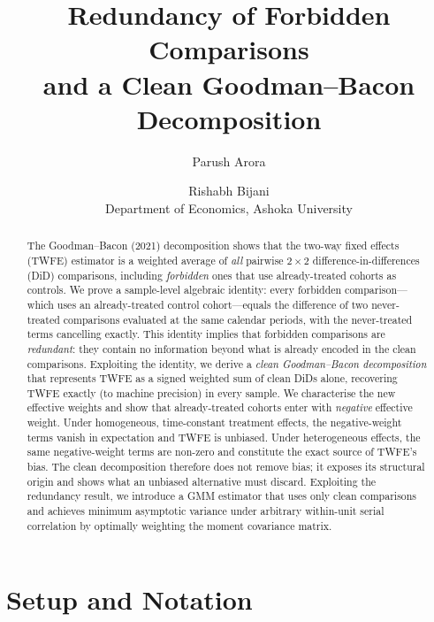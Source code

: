 \documentclass[12pt,letterpaper]{article}
\title{%
  Redundancy of Forbidden Comparisons\\
  and a Clean Goodman--Bacon Decomposition%
}
\author{Parush Arora \and Rishabh Bijani\\
  \small Department of Economics, Ashoka University}
\date{}
\theoremstyle{remark}
\theoremstyle{definition}
\begin{document}
\maketitle

\begin{abstract}
The Goodman--Bacon (2021) decomposition shows that the two-way fixed effects
(TWFE) estimator is a weighted average of \emph{all} pairwise $2\times 2$
difference-in-differences (DiD) comparisons, including \emph{forbidden} ones
that use already-treated cohorts as controls. We prove a sample-level
algebraic identity: every forbidden comparison---which uses an already-treated
control cohort---equals the difference of two never-treated comparisons
evaluated at the same calendar periods, with the never-treated terms cancelling
exactly. This identity implies that forbidden comparisons are
\emph{redundant}: they contain no information beyond what is already encoded
in the clean comparisons. Exploiting the identity, we derive a \emph{clean
Goodman--Bacon decomposition} that represents TWFE as a signed weighted sum of
clean DiDs alone, recovering TWFE exactly (to machine precision) in every
sample. We characterise the new effective weights and show that already-treated
cohorts enter with \emph{negative} effective weight. Under homogeneous,
time-constant treatment effects, the negative-weight terms vanish in
expectation and TWFE is unbiased. Under heterogeneous effects, the same
negative-weight terms are non-zero and constitute the exact source of TWFE's
bias. The clean decomposition therefore does not remove bias; it exposes its
structural origin and shows what an unbiased alternative must discard.
Exploiting the redundancy result, we introduce a GMM estimator that uses only
clean comparisons and achieves minimum asymptotic variance under arbitrary
within-unit serial correlation by optimally weighting the moment covariance
matrix.
\end{abstract}

\tableofcontents
\newpage

\section{Setup and Notation}
\label{sec:setup}
\end{document}
